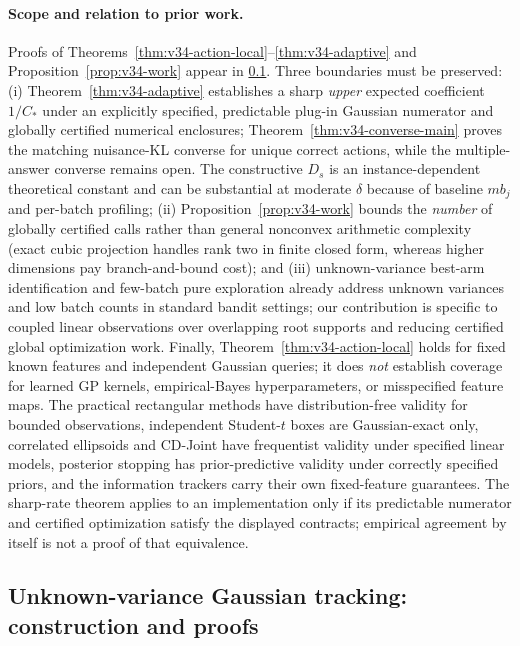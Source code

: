 \documentclass{article}
\theoremstyle{plain}
\theoremstyle{definition}
\begin{document}
\paragraph{Scope and relation to prior work.}
Proofs of Theorems~\ref{thm:v34-action-local}--\ref{thm:v34-adaptive} and Proposition~\ref{prop:v34-work} appear in \cref{app:v34-theory}. Three boundaries must be preserved: (i) Theorem~\ref{thm:v34-adaptive} establishes a sharp \emph{upper} expected coefficient $1/C_*$ under an explicitly specified, predictable plug-in Gaussian numerator and globally certified numerical enclosures; Theorem~\ref{thm:v34-converse-main} proves the matching nuisance-KL converse for unique correct actions, while the multiple-answer converse remains open. The constructive $D_s$ is an instance-dependent theoretical constant and can be substantial at moderate $\delta$ because of baseline $mb_j$ and per-batch profiling; (ii) Proposition~\ref{prop:v34-work} bounds the \emph{number} of globally certified calls rather than general nonconvex arithmetic complexity (exact cubic projection handles rank two in finite closed form, whereas higher dimensions pay branch-and-bound cost); and (iii) unknown-variance best-arm identification \citep{jourdan2023unknown} and few-batch pure exploration \citep{jin2024batched,tuynman2025batch} already address unknown variances and low batch counts in standard bandit settings; our contribution is specific to coupled linear observations over overlapping root supports and reducing certified global optimization work. Finally, Theorem~\ref{thm:v34-action-local} holds for fixed known features and independent Gaussian queries; it does \emph{not} establish coverage for learned GP kernels, empirical-Bayes hyperparameters, or misspecified feature maps. The practical rectangular methods have distribution-free validity for bounded observations, independent Student-$t$ boxes are Gaussian-exact only, correlated ellipsoids and CD-Joint have frequentist validity under specified linear models, posterior stopping has prior-predictive validity under correctly specified priors, and the information trackers carry their own fixed-feature guarantees. The sharp-rate theorem applies to an implementation only if its predictable numerator and certified optimization satisfy the displayed contracts; empirical agreement by itself is not a proof of that equivalence.

\subsection{Unknown-variance Gaussian tracking: construction and proofs}
\label{app:v34-theory}
\end{document}
